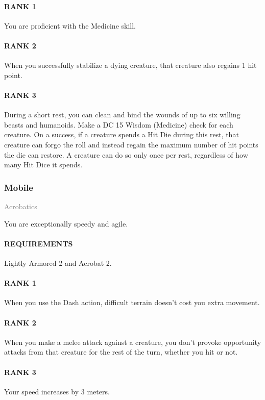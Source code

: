 \paragraph{RANK 1} You are proficient with the Medicine skill.
\paragraph{RANK 2} When you successfully stabilize a dying creature, that creature also regains 1 hit point.
\paragraph{RANK 3} During a short rest, you can clean and bind the wounds of up to six willing beasts and humanoids.
Make a DC 15 Wisdom (Medicine) check for each creature.
On a success, if a creature spends a Hit Die during this rest, that creature can forgo the roll and instead regain the maximum number of hit points the die can restore.
A creature can do so only once per rest, regardless of how many Hit Dice it spends.

\subsubsection{Mobile} \label{feat::mobile}
\small{\textcolor{gray}{Acrobatics}}

\normalsize
You are exceptionally speedy and agile.
\paragraph{REQUIREMENTS} Lightly Armored 2 and Acrobat 2.
\paragraph{RANK 1} When you use the Dash action, difficult terrain doesn't cost you extra movement.
\paragraph{RANK 2} When you make a melee attack against a creature, you don't provoke opportunity attacks from that creature for the rest of the turn, whether you hit or not.
\paragraph{RANK 3} Your speed increases by 3 meters.

